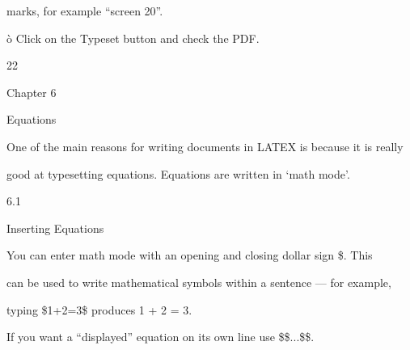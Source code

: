 \documentclass[a4paper,portrait,12pt]{article}
\begin{document}
\begin{flushleft}
marks, for example {``}screen 20''.
\end{flushleft}


\begin{flushleft}
\`{o} Click on the Typeset button and check the PDF.
\end{flushleft}





22





\begin{flushleft}
\newpage
Chapter 6
\end{flushleft}


\begin{flushleft}
Equations
\end{flushleft}


\begin{flushleft}
One of the main reasons for writing documents in LATEX is because it is really
\end{flushleft}


\begin{flushleft}
good at typesetting equations. Equations are written in {`}math mode'.
\end{flushleft}





6.1





\begin{flushleft}
Inserting Equations
\end{flushleft}





\begin{flushleft}
You can enter math mode with an opening and closing dollar sign \$. This
\end{flushleft}


\begin{flushleft}
can be used to write mathematical symbols within a sentence --- for example,
\end{flushleft}


\begin{flushleft}
typing \$1+2=3\$ produces 1 + 2 = 3.
\end{flushleft}


\begin{flushleft}
If you want a {``}displayed'' equation on its own line use \$\$...\$\$.
\end{flushleft}
\end{document}
